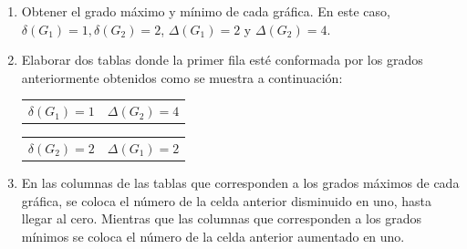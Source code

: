 \documentclass[fleqn, 11pt]{article}
\begin{document}
\begin{ejemplo}[breakable, pad at break = 4mm, beforeafter skip = 3mm]{}{}
        \begin{enumerate}
            \item Obtener el grado máximo y mínimo de cada gráfica. En este caso, $ \delta(G_1) = 1, \delta(G_2) = 2 $, \mbox{$ \Delta(G_1) = 2 $} y $ \Delta(G_2) = 4 $. \vspace{3mm}
            \item Elaborar dos tablas donde la primer fila esté conformada por los grados anteriormente obtenidos como se muestra a continuación: \vspace{3mm}
            
            \begin{center}
                \begin{minipage}[h]{0.3\linewidth}
                    \begin{tcolorbox}[title empty, center, colframe = black!99!white, colback = white, sharp corners, hbox, left = -0.9mm, right = -0.9mm, top = -0.9mm, bottom = -0.9mm]
                        \begin{tabular}{c|c}
                            \rowcolor{gray!36!white} 
                            $ \delta(G_1) = 1 $ & $ \Delta(G_2) = 4 $ 
                        \end{tabular}
                    \end{tcolorbox}
                \end{minipage}
                \begin{minipage}[h]{0.3\linewidth}
                    \begin{tcolorbox}[title empty, center, colframe = black!99!white, colback = white, sharp corners, hbox, left = -0.9mm, right = -0.9mm, top = -0.9mm, bottom = -0.9mm]
                        \begin{tabular}{c|c}
                            \rowcolor{gray!36!white} 
                            $ \delta(G_2) = 2 $ & $ \Delta(G_1) = 2 $ 
                        \end{tabular}
                    \end{tcolorbox}
                \end{minipage}
            \end{center} \vspace{3mm}
            
            \item En las columnas de las tablas que corresponden a los grados máximos de cada gráfica, se coloca el número de la celda anterior disminuido en uno, hasta llegar al cero. Mientras que las columnas que corresponden a los grados mínimos se coloca el número de la celda anterior aumentado en uno. \vspace{3mm}
            

\end{enumerate}
\end{ejemplo}
\end{document}
